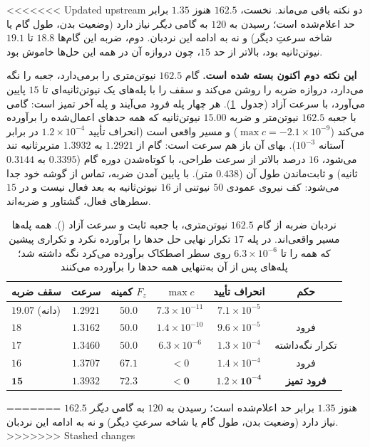 \documentclass[10pt,twocolumn]{article}
\newcommand{\code}[1]{\lr{\texttt{#1}}}
\newcommand{\nd}{\lr{\textendash}}
\begin{document}
<<<<<<< Updated upstream
دو نکته باقی می‌ماند. نخست، $162.5$ هنوز $1.35$ برابر حد اعلام‌شده است؛ رسیدن به $120$ به
گامی \emph{دیگر} نیاز دارد (وضعیت بدن، طول گام یا شاخه سرعتِ دیگر) و نه به ادامه این نردبان.
دوم، ضربه این گام‌ها $18.8$ تا $19.1$ نیوتن‌ثانیه بود، بالاتر از حد $15$، چون دروازه آن در
همه این حل‌ها خاموش بود.

\textbf{این نکته دوم اکنون بسته شده است.} \code{ch3\_impulse\_march} گام $162.5$
نیوتن‌متری را برمی‌دارد، جعبه را نگه می‌دارد، دروازه ضربه را روشن می‌کند و سقف را با
پله‌های یک نیوتن‌ثانیه‌ای تا $15$ پایین می‌آورد، با سرعت آزاد (جدول~\ref{tab:impulsemarch}).
هر چهار پله فرود می‌آیند و پله آخر تمیز است: گامی با جعبه $162.5$ نیوتن‌متر و ضربه $15.00$
نیوتن‌ثانیه که همه حدهای اعمال‌شده را برآورده می‌کند ($\max c=-2.1\times10^{-9}$) و مسیر واقعی
است (انحراف تأیید $1.2\times10^{-4}$ در برابر آستانه $10^{-3}$). بهای آن باز هم سرعت است: گام
از $1.2921$ به $1.3932$ متربرثانیه تند می‌شود، $16$ درصد بالاتر از سرعت طراحی، با کوتاه‌شدن
دوره گام ($0.3395$ به $0.3144$ ثانیه) و ثابت‌ماندن طول آن ($0.438$ متر). با پایین آمدن ضربه،
تماس از گوشه خود جدا می‌شود: کف نیروی عمودی $50$ نیوتنی از $16$ نیوتن‌ثانیه به بعد فعال نیست
و در $15$ سطرهای فعال، گشتاور و ضربه‌اند.

\begin{table}[H]
    \centering
    \caption{نردبان ضربه از گام $162.5$ نیوتن‌متری، با جعبه ثابت و سرعت آزاد
    (\code{ch3\_impulse\_march}). همه پله‌ها مسیر واقعی‌اند. در پله $17$ تکرار نهایی حل
    حدها را برآورده نکرد و تکراری پیشین که همه را تا $6.3\times10^{-6}$ روی سطر اصطکاک برآورده
    می‌کرد نگه داشته شد؛ پله‌های پس از آن به‌تنهایی همه حدها را برآورده می‌کنند}
    \label{tab:impulsemarch}
    \small
    \begin{tabular}{lccccc}
        \toprule
        سقف ضربه & سرعت & کمینه $F_z$ & $\max c$ & انحراف تأیید & حکم \\
        \midrule
        $19.07$ (دانه) & $1.2921$ & $50.0$ & $7.3\times10^{-11}$ & $7.1\times10^{-5}$ & \nd{} \\
        $18$ & $1.3162$ & $50.0$ & $1.4\times10^{-10}$ & $9.6\times10^{-5}$ & فرود \\
        $17$ & $1.3460$ & $50.0$ & $6.3\times10^{-6}$ & $1.3\times10^{-4}$ & تکرار نگه‌داشته \\
        $16$ & $1.3707$ & $67.1$ & $<0$ & $1.4\times10^{-4}$ & فرود \\
        $\mathbf{15}$ & $\mathbf{1.3932}$ & $\mathbf{72.3}$ & $\mathbf{<0}$ & $\mathbf{1.2\times10^{-4}}$ & \textbf{فرود تمیز} \\
        \bottomrule
    \end{tabular}
\end{table}
=======
$162.5$ هنوز $1.35$ برابر حد اعلام‌شده است؛ رسیدن به $120$ به گامی \emph{دیگر} نیاز دارد
(وضعیت بدن، طول گام یا شاخه سرعتِ دیگر) و نه به ادامه این نردبان.
>>>>>>> Stashed changes
\end{document}
